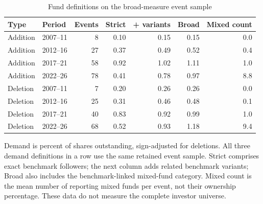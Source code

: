 \begin{table}[!htbp]
\centering
\caption{Fund definitions on the broad-measure event sample}\label{tab:holdings_coverage}
\small
\setlength{\tabcolsep}{5pt}
\begin{tabular}{llrrrrr}
\toprule
Type & Period & Events & Strict & + variants & Broad & Mixed count \\
\midrule
Addition & 2007--11 & 8 & 0.10 & 0.15 & 0.15 & 0.0 \\
Addition & 2012--16 & 27 & 0.37 & 0.49 & 0.52 & 0.4 \\
Addition & 2017--21 & 58 & 0.92 & 1.02 & 1.11 & 1.0 \\
Addition & 2022--26 & 78 & 0.41 & 0.78 & 0.97 & 8.8 \\
Deletion & 2007--11 & 7 & 0.20 & 0.26 & 0.26 & 0.0 \\
Deletion & 2012--16 & 25 & 0.31 & 0.46 & 0.48 & 0.1 \\
Deletion & 2017--21 & 40 & 0.83 & 0.92 & 0.99 & 1.0 \\
Deletion & 2022--26 & 68 & 0.52 & 0.93 & 1.18 & 9.4 \\
\bottomrule
\end{tabular}
\begin{minipage}{\linewidth}\footnotesize\vspace{5pt}
Demand is percent of shares outstanding, sign-adjusted for deletions. All three demand definitions in a row use the same retained event sample. Strict comprises exact benchmark followers; the next column adds related benchmark variants; Broad also includes the benchmark-linked mixed-fund category. Mixed count is the mean number of reporting mixed funds per event, not their ownership percentage. These data do not measure the complete investor universe.
\end{minipage}
\end{table}
